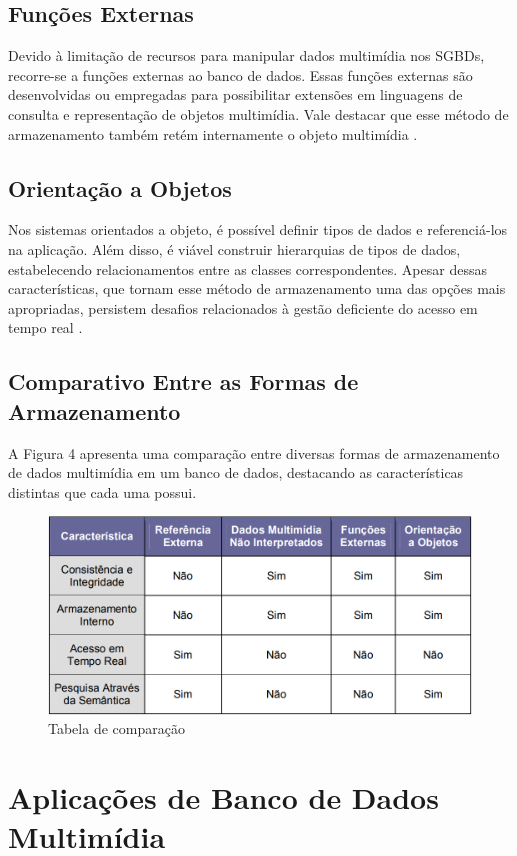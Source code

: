 \documentclass[12pt]{article}
\begin{document}
	\subsection{Funções Externas}
	
	Devido à limitação de recursos para manipular dados multimídia nos SGBDs, recorre-se a funções externas ao banco de dados. Essas funções externas são desenvolvidas ou empregadas para possibilitar extensões em linguagens de consulta e representação de objetos multimídia. Vale destacar que esse método de armazenamento também retém internamente o objeto multimídia \cite{silva2006benchmark}.
	
	\subsection{Orientação a Objetos}
	
	Nos sistemas orientados a objeto, é possível definir tipos de dados e referenciá-los na aplicação. Além disso, é viável construir hierarquias de tipos de dados, estabelecendo relacionamentos entre as classes correspondentes. Apesar dessas características, que tornam esse método de armazenamento uma das opções mais apropriadas, persistem desafios relacionados à gestão deficiente do acesso em tempo real \cite{silva2006benchmark}.
	
	\subsection{Comparativo Entre as Formas de Armazenamento}
	
	A Figura 4 apresenta uma comparação entre diversas formas de armazenamento de dados multimídia em um banco de dados, destacando as características distintas que cada uma possui.
	
	\begin{figure}[ht]
		\centering
		\includegraphics[width=0.7\linewidth]{image.jpg}
		\caption{Tabela de comparação}
		\label{fig:enter-label}
	\end{figure}
	
	\section{Aplicações de Banco de Dados Multimídia}
	
\end{document}
